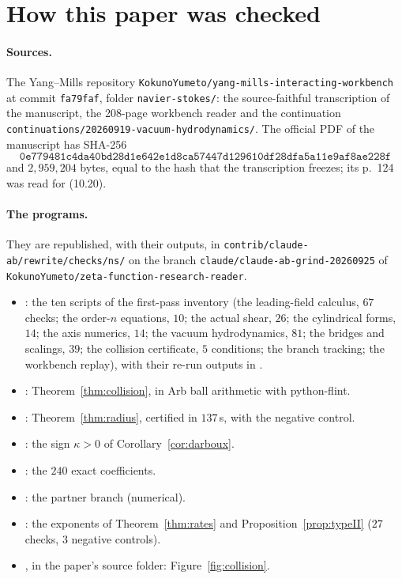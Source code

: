 \section{How this paper was checked}\label{app:verification}

\paragraph{Sources.}
The Yang--Mills repository \texttt{KokunoYumeto/yang-mills-interacting-workbench} at commit \texttt{fa79faf}, folder \texttt{navier-stokes/}: the source-faithful transcription of the manuscript, the 208-page workbench reader and the continuation \texttt{continuations/20260919-vacuum-hydrodynamics/}. The official PDF of the manuscript \cite{OpenAINS} has SHA-256
\[\texttt{0e779481c4da40bd28d1e642e1d8ca57447d129610df28dfa5a11e9af8ae228f}\]
and $2{,}959{,}204$ bytes, equal to the hash that the transcription freezes; its p.~124 was read for (10.20).

\paragraph{The programs.}
They are republished, with their outputs, in \texttt{contrib/\allowbreak claude-ab/\allowbreak rewrite/\allowbreak checks/\allowbreak ns/} on the branch \texttt{claude/claude-ab-grind-20260925} of \texttt{KokunoYumeto/zeta-function-research-reader}.
\begin{itemize}
\item {}: the ten scripts of the first-pass inventory (the leading-field calculus, $67$ checks; the order-$n$ equations, $10$; the actual shear, $26$; the cylindrical forms, $14$; the axis numerics, $14$; the vacuum hydrodynamics, $81$; the bridges and scalings, $39$; the collision certificate, $5$ conditions; the branch tracking; the workbench replay), with their re-run outputs in .
\item {}: Theorem~\ref{thm:collision}, in Arb ball arithmetic with python-flint.
\item {}: Theorem~\ref{thm:radius}, certified in $137$\,s, with the negative control.
\item {}: the sign $\kappa>0$ of Corollary~\ref{cor:darboux}.
\item {}: the $240$ exact coefficients.
\item {}: the partner branch (numerical).
\item {}: the exponents of Theorem~\ref{thm:rates} and Proposition~\ref{prop:typeII} ($27$ checks, $3$ negative controls).
\item {}, in the paper's source folder: Figure~\ref{fig:collision}.
\end{itemize}

